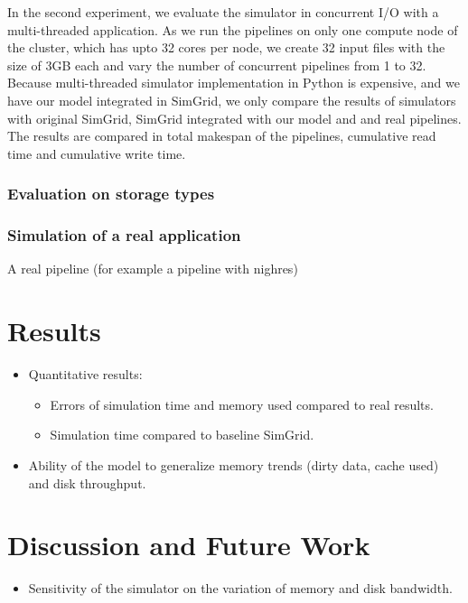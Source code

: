 \documentclass[conference]{IEEEtran}
\begin{document}
				In the second experiment, we evaluate the simulator in concurrent I/O 
				with a multi-threaded application. As we run the pipelines on 
				only one compute node of the cluster, which has upto 32 cores per node,  
				we create 32 input files with the size of 3GB each and vary the number of 
				concurrent pipelines from 1 to 32. 
				Because multi-threaded simulator implementation in Python is 
				expensive, and we have our model integrated in SimGrid, 
				we only compare the results of simulators with original SimGrid, 
				SimGrid integrated with our model and and real pipelines. 
				The results are compared in total makespan of the pipelines, 
				cumulative read time and cumulative write time.
			
			\subsubsection{Evaluation on storage types}

				

			\subsubsection{Simulation of a real application}
				A real pipeline (for example a pipeline with nighres)

	\section{Results}
	
		\begin{itemize}

			\item Quantitative results: 
				\begin{itemize}
					\item Errors of simulation time and memory used compared to real results.
					\item Simulation time compared to baseline SimGrid.
				\end{itemize} 

			\item Ability of the model to generalize memory trends (dirty data, cache used) and disk throughput.

		\end{itemize}

	\section{Discussion and Future Work}
		\begin{itemize}
			\item Sensitivity of the simulator on the variation of memory and disk bandwidth. 
		\end{itemize}


\end{document}
